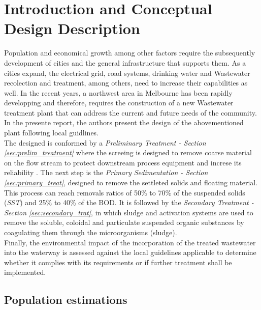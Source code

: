 \documentclass[12pt]{article}
\begin{document}
\setcounter{page}{1}
\sloppy

\section{Introduction and Conceptual Design Description}
Population and economical growth among other factors require the subsequently development of cities and the
general infrastructure that supports them. As a cities expand, the electrical grid, road systems, drinking water and Wastewater
recolection and treatment, among others, need to increase their capabilities as well. In the recent years, a northwest area in
Melbourne has been rapidly developping and therefore, requires the construction of a new Wastewater treatment plant that can 
address the current and future needs of the community. In the presente report, the authors present the design of the abovementioned
plant following local guidlines.\\

The designed is conformed by a \textit{Preliminary Treatment - Section \ref{sec:prelim_treatment}} 
where the screeing is designed to remove coarse material 
on the flow stream to protect downstream process equipment and 
increse its reliability \cite{metcalf_2014_wastewater}.
The next step is the \textit{Primary Sedimentation - Section \ref{sec:primary_treat}}, 
designed to remove the settleted solids and floating material. 
This process can reach removals ratios of 50\% to 70\% of the 
suspended solids (\textit{SST}) and 25\% to 40\% of the BOD.
It is followed by the \textit{Secondary Treatment - Section \ref{sec:secondary_trat}}, 
in which sludge and activation systems are used to remove the
soluble, coloidal and particulate suspended organic substances 
by coagulating them through the microorganisms (sludge). \\

Finally, the environmental impact of the incorporation of the 
treated wastewater into the waterway is assessed against the 
local guidelines applicable to determine whether it complies 
with its requirements or if further treatment shall be implemented.\\


\subsection{Population estimations}
\end{document}
